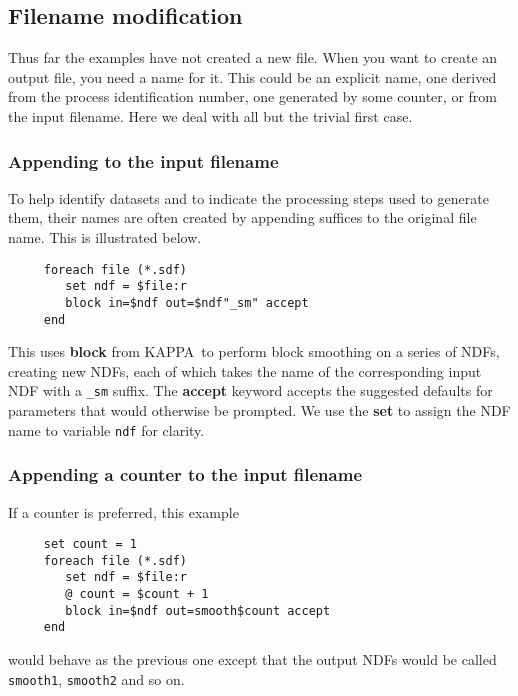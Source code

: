 \documentclass[twoside,11pt]{article}
\newcommand{\htmlref}[2]{#1}
\newcommand{\latex}[1]{#1}
\newcommand{\xref}[3]{#1}
\newcommand{\xlabel}[1]{}
\newcommand{\KAPPAref}{\xref{{\footnotesize KAPPA}}{sun95}{}}
\newcommand{\NDFref}[1]{\xref{#1}{sun33}{}}
\begin{document}
\subsection{\xlabel{sc4_se_filename_mod}Filename modification
\label{sc4_se_filename_mod}}

\latex{Thus far the examples have not created a new file.} When you
want to create an output file, you need a name for it.  This could be an
explicit name, one derived from the \htmlref{{\sf process identification
number}}{sc4_gl_pid}, one
generated by some counter, or from the input filename.  Here we deal
with all but the trivial first case.

\subsubsection{\xlabel{sc4_se_append_filename}Appending to the input
filename\label{sc4_se_append_filename}}

To help identify datasets and to indicate the processing steps used to
generate them, their names are often created by appending suffices to
the original file name.  This is illustrated below.

\small
\begin{verbatim}
     foreach file (*.sdf)
        set ndf = $file:r
        block in=$ndf out=$ndf"_sm" accept
     end
\end{verbatim}
\normalsize
This uses \xref{{\bf block}}{sun95}{BLOCK} from \KAPPAref\normalsize\ to perform
block smoothing on a series of \NDFref{{\sf NDF}s}, creating new NDFs,
each of which takes the name of the corresponding input NDF with a
{\tt \_sm} suffix.  The {\bf accept} keyword accepts the suggested
defaults for parameters that would otherwise be prompted.  We use the
{\bf set} to assign the NDF name to variable {\tt ndf} for clarity.

\subsubsection{\xlabel{sc4_se_append_counter}Appending a counter to the input
filename\label{sc4_se_append_counter}}

If a counter is preferred, this example

\small
\begin{verbatim}
     set count = 1
     foreach file (*.sdf)
        set ndf = $file:r
        @ count = $count + 1
        block in=$ndf out=smooth$count accept
     end
\end{verbatim}
\normalsize
would behave as the previous one except that the output NDFs would be
called {\tt smooth1}, {\tt smooth2} and so on.
\end{document}
